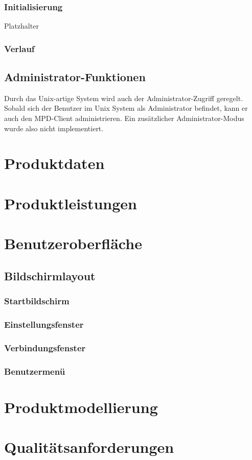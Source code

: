\subsubsection{Initialisierung}
Platzhalter
\subsubsection{Verlauf}
\subsection{Administrator-Funktionen}
Durch das Unix-artige System wird auch der Administrator-Zugriff geregelt. Sobald sich der Benutzer im Unix System
als Administrator befindet, kann er auch den MPD-Client administrieren. Ein zusätzlicher Administrator-Modus wurde also
nicht implementiert.
\section{Produktdaten}
\section{Produktleistungen}
\section{Benutzeroberfläche}
\subsection{Bildschirmlayout}
\subsubsection{Startbildschirm}
\subsubsection{Einstellungsfenster}
\subsubsection{Verbindungsfenster}
\subsubsection{Benutzermenü}
\section{Produktmodellierung}
\section{Qualitätsanforderungen}
